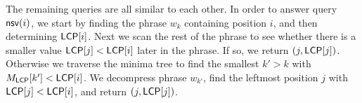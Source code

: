 The remaining queries are all similar to each other. In order to answer query
$\mathsf{nsv}(i)$, we start by finding the phrase $w_{k}$ containing position $i$,
and then determining $\mathsf{LCP}[i]$. Next we scan the rest of the phrase to see
whether there is a smaller value $\mathsf{LCP}[j] < \mathsf{LCP}[i]$ later in the phrase. If
so, we return $(j,\mathsf{LCP}[j])$. Otherwise we traverse the minima tree to find
the smallest $k' > k$ with $M_{\mathsf{LCP}}[k'] < \mathsf{LCP}[i]$. We decompress
phrase $w_{k'}$, find the leftmost position $j$ with $\mathsf{LCP}[j] < \mathsf{LCP}[i]$,
and return $(j,\mathsf{LCP}[j])$.

